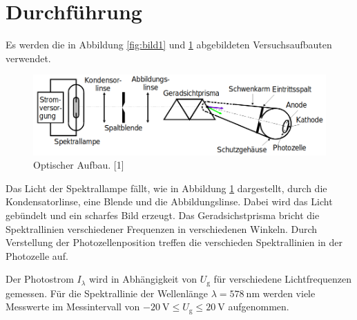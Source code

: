 \section{Durchführung}
\label{sec:Durchführung}

Es werden die in Abbildung \ref{fig:bild1} und \ref{fig:bild2} abgebildeten Versuchsaufbauten verwendet.

\begin{figure}
    \centering
    \includegraphics[scale=0.4]{content/bild2.png}
    \caption{Optischer Aufbau. [1]}
    \label{fig:bild2}
\end{figure}

Das Licht der Spektrallampe fällt, wie in Abbildung \ref{fig:bild2} dargestellt, durch
die Kondensatorlinse, eine Blende und die Abbildungslinse. Dabei wird das Licht gebündelt und ein
scharfes Bild erzeugt. Das Geradsichstprisma bricht die Spektrallinien verschiedener Frequenzen in 
verschiedenen Winkeln.
Durch Verstellung der Photozellenposition treffen die verschieden Spektrallinien in der Photozelle auf.

Der Photostrom $I_\lambda$ wird in Abhängigkeit von $U_\text{g}$ für verschiedene Lichtfrequenzen gemessen.
Für die Spektrallinie der Wellenlänge $\lambda = \SI{578}{\nano\meter}$ werden viele Messwerte im Messintervall
von $\SI{-20}{\volt} \leq U_\text{g} \leq \SI{20}{\volt}$ aufgenommen.
